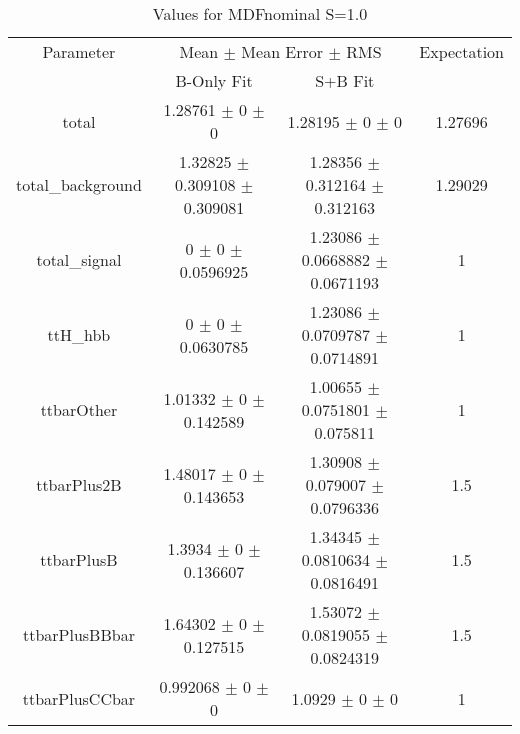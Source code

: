 \begin{table}
\centering
\caption{Values for MDFnominal S=1.0}
\begin{tabular}{cccc}
\toprule
Parameter & \multicolumn{2}{c}{Mean $\pm$ Mean Error $\pm$ RMS} & Expectation\\
 & B-Only Fit & S+B Fit & \\
\midrule
total & \num{1.28761} $\pm$ \num{0} $\pm$ \num{0} & \num{1.28195} $\pm$ \num{0} $\pm$ \num{0} & \num{1.27696}\\
total\_background & \num{1.32825} $\pm$ \num{0.309108} $\pm$ \num{0.309081} & \num{1.28356} $\pm$ \num{0.312164} $\pm$ \num{0.312163} & \num{1.29029}\\
total\_signal & \num{0} $\pm$ \num{0} $\pm$ \num{0.0596925} & \num{1.23086} $\pm$ \num{0.0668882} $\pm$ \num{0.0671193} & \num{1}\\
ttH\_hbb & \num{0} $\pm$ \num{0} $\pm$ \num{0.0630785} & \num{1.23086} $\pm$ \num{0.0709787} $\pm$ \num{0.0714891} & \num{1}\\
ttbarOther & \num{1.01332} $\pm$ \num{0} $\pm$ \num{0.142589} & \num{1.00655} $\pm$ \num{0.0751801} $\pm$ \num{0.075811} & \num{1}\\
ttbarPlus2B & \num{1.48017} $\pm$ \num{0} $\pm$ \num{0.143653} & \num{1.30908} $\pm$ \num{0.079007} $\pm$ \num{0.0796336} & \num{1.5}\\
ttbarPlusB & \num{1.3934} $\pm$ \num{0} $\pm$ \num{0.136607} & \num{1.34345} $\pm$ \num{0.0810634} $\pm$ \num{0.0816491} & \num{1.5}\\
ttbarPlusBBbar & \num{1.64302} $\pm$ \num{0} $\pm$ \num{0.127515} & \num{1.53072} $\pm$ \num{0.0819055} $\pm$ \num{0.0824319} & \num{1.5}\\
ttbarPlusCCbar & \num{0.992068} $\pm$ \num{0} $\pm$ \num{0} & \num{1.0929} $\pm$ \num{0} $\pm$ \num{0} & \num{1}\\
\bottomrule
\end{tabular}
\end{table}